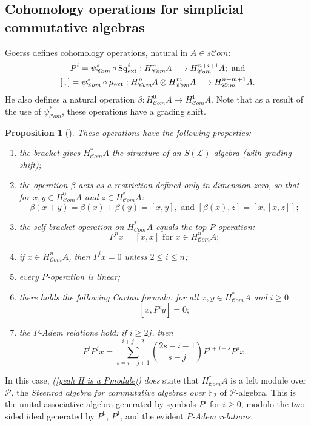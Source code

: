 \documentclass[11pt]{amsart} \renewcommand{\baselinestretch}{1.4}
\theoremstyle{plain}
\newtheorem{prop}[thm]{Proposition}
\theoremstyle{definition}
\renewcommand{\to}{\longrightarrow}
\newcommand{\scrL}{\mathscr{L}}
\newcommand{\scrC}{\mathscr{C}}
\newcommand{\calP}{\mathcal{P}}
\newcommand{\citeBOX}[2][]{\cite[\mbox{#1}]{#2}}
\newcommand{\Palg}{{\calP}}
\newcommand{\LieOperad}{{\scrL}}
\newcommand{\ExtCohOp}{\mathrm{Sq}_\mathrm{ext}}
\newcommand{\ExtCohProd}{\mu_\mathrm{ext}}
\newcommand{\F}{\mathbb{F}}
\newcommand{\algs}{{\scrC\!\textit{om}}}
\newcommand{\Ftwo}{\F_2}
\begin{document}
\begin{Constructing cohomology operations}
\subsection{Cohomology operations for simplicial commutative algebras}
\label{The example of simplicial commutative F2-algebras}
Goerss \citeBOX[\S5]{MR1089001} defines cohomology operations, natural in $A\in s \algs$:
\begin{gather*}
P^i=\psi^*_{\algs}\circ\ExtCohOp^i:H^n_{\algs}A\to H_{\algs}^{n+i+1}A;\textup{ and}\\
[\,,]=\psi^*_{\algs}\circ\ExtCohProd :H_{\algs}^nA\otimes H_{\algs}^mA\to H_{\algs}^{n+m+1}A.
\end{gather*}
He also defines a natural operation $\beta:H_{\algs}^0A\to H_{\algs}^1A$. Note that as a result of the use of $\psi^*_{\algs}$, these operations have a grading shift.
\begin{prop}[{\citeBOX[\S5]{MR1089001}}]
\label{omnibus on coh of simp algs}These operations have the following properties:
\begin{enumerate}
\item the bracket gives $H^*_{\algs}A$ the structure of an $S(\LieOperad)$-algebra (with grading shift);
\item the operation $\beta$ acts as a restriction defined only in dimension zero, so that for $x,y\in H^0_{\algs}A$ and $z\in H^*_{\algs}A$:
\[\beta(x+y)=\beta(x)+\beta(y)=[x,y],\text{\ \ and \ }[\beta(x),z]=[x,[x,z]];\]
\item the self-bracket operation on $H^*_{\algs}A$ equals the \emph{top $P$-operation}:
\[P^nx=[x,x]\text{\ \ for $x\in H^n_{\algs}A$};\]
\item \label{P unstable vanishing} if $x\in H^n_{\algs}A$, then $P^ix=0$ unless $2\leq i\leq n$;
\item every $P$-operation is linear;
\item there holds the following \emph{Cartan formula}:  for all $x,y\in   H^*_{\algs}A$ and $i\geq0$,
\[[x,P^iy]=0;\]
\item \label{yeah H is a Pmodule}the \emph{$P$-Adem relations} hold: if $i\geq 2j$, then
\[P^iP^jx=\sum_{s=i-j+1}^{i+j-2}{2s-i-1\choose s-j}P^{i+j-s}P^sx.\]
\end{enumerate}
\end{prop}
In this case, \emph{(\ref{yeah H is a Pmodule})} \emph{does} state that $H^*_{\algs}A$ is a left module over $\Palg$, the \emph{Steenrod algebra for commutative algebras over $\Ftwo $} of $\Palg$-algebra. This is the unital associative algebra generated by symbols $P^i$ for $i\geq0$, modulo the two sided ideal generated by $P^0$, $P^1$, and the evident \emph{$P$-Adem relations}.



\end{Constructing cohomology operations}
\end{document}
